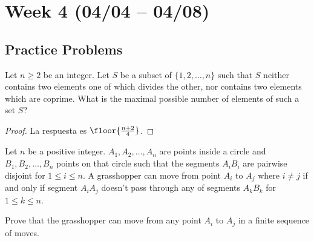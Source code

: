 \section{Week 4 (04/04 -- 04/08)}

\subsection{Practice Problems}

\begin{probMR}[Balkan MO 2005/4]
	Let $n\ge 2$ be an integer. Let $S$ be a subset of $\{1,2,\dots,n\}$ such that $S$ neither contains two elements one of which divides the other, nor contains two elements which are coprime. What is the maximal possible number of elements of such a set $S$?
\end{probMR}

\begin{proof}
	La respuesta es $\floor{\frac{n+2}{4}}$.
\end{proof}

\begin{probMB}[Croatian MO 2018/5]
	Let $n$ be a positive integer. $A_1,A_2,\dots,A_n$ are points inside a circle and $B_1,B_2,\dots,B_n$ points on that circle such that the segments $A_iB_i$ are pairwise disjoint for $1\le i\le n$. A grasshopper can move from point $A_i$ to $A_j$ where $i\ne j$ if and only if segment $A_iA_j$ doesn't pass through any of segments $A_kB_k$ for $1\le k\le n$.

	Prove that the grasshopper can move from any point $A_i$ to $A_j$ in a finite sequence of moves.
\end{probMB}
